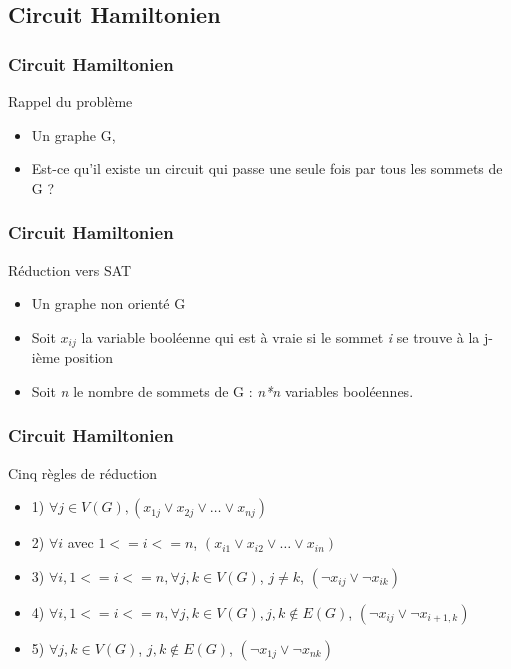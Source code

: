 


\subsection{Circuit Hamiltonien}

\begin{frame}
\frametitle{Circuit Hamiltonien}
\begin{block}{Rappel du probl\`eme}
  \begin{itemize}
  \item Un graphe G,
  \item Est-ce qu'il existe un circuit qui passe une seule fois par
    tous les sommets de G ?
  \end{itemize}
\end{block}
\end{frame}

\begin{frame}
\frametitle{Circuit Hamiltonien}
\begin{block}{R\'eduction vers SAT}
  \begin{itemize}
  \item Un graphe non orient\'e G
  \item Soit \textit{$x_{ij}$} la variable bool\'eenne qui est \`a
    vraie si le sommet \textit{i} se trouve \`a la j-i\`eme position
  \item Soit \textit{n} le nombre de sommets de G : \textit{n*n}
    variables bool\'eennes.
  \end{itemize}
\end{block}
\end{frame}

\begin{frame}
\frametitle{Circuit Hamiltonien}
\begin{block}{Cinq r\`egles de r\'eduction}
  \begin{itemize}
  \item 1) $\forall j \in V(G), (x_{1j} \vee x_{2j} \vee \ldots \vee
    x_{nj})$
  \item 2) $\forall i$ avec $1 <= i <= n$, $(x_{i1} \vee x_{i2} \vee
    \ldots \vee x_{in})$
  \item 3) $\forall i, 1 <= i <= n, \forall {j, k} \in V(G)$, $j \ne
    k$, $(\neg x_{ij} \vee \neg x_{ik})$
  \item 4) $\forall i, 1 <= i <= n, \forall {j, k} \in V(G), {j,k}
    \notin E(G)$, $(\neg x_{ij} \vee \neg x_{i+1,k})$
  \item 5) $\forall j,k \in V(G)$, ${j,k} \notin E(G)$, $(\neg x_{1j}
    \vee \neg x_{nk})$
  \end{itemize}
\end{block}
\end{frame}

